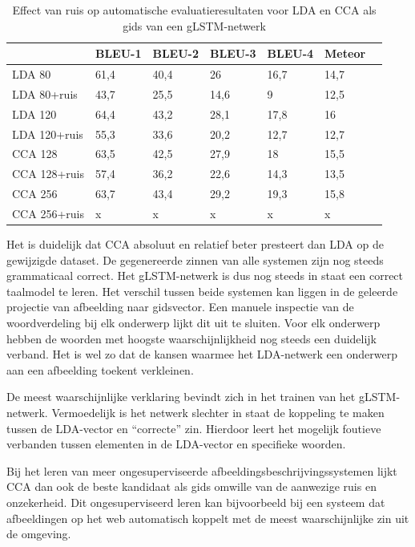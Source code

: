 \begin{table}
	\centering
	\begin{tabular}{lllllll}
		~                  & BLEU-1 & BLEU-2 & BLEU-3 & BLEU-4 & Meteor \\ \hline
		LDA 80        & 61,4   & 40,4 			& 26   & 16,7  & 14,7 \\
		LDA 80+ruis & 43,7  &25,5    &14,6   & 9   & 12,5 \\ \hline
		LDA 120   & 64,4   & 43,2   & 28,1   & 17,8 & 16 \\
		LDA 120+ruis   & 55,3   & 33,6   & 20,2   & 12,7 & 12,7 \\ \hline
		CCA 128   & 63,5   & 42,5   & 27,9   & 18 & 15,5 \\
		CCA 128+ruis   & 57,4   & 36,2   & 22,6   & 14,3 & 13,5 \\ \hline
		CCA 256   & 63,7   & 43,4   & 29,2   & 19,3 & 15,8 \\
		CCA 256+ruis   & x  & x   & x   & x & x \\ \hline			
	\end{tabular}
	\caption{Effect van ruis op automatische evaluatieresultaten voor LDA en CCA als gids van een gLSTM-netwerk}
	\label{table:ruis}
\end{table}

Het is duidelijk dat CCA absoluut en relatief beter presteert dan LDA op de gewijzigde dataset.
De gegenereerde zinnen van alle systemen zijn nog steeds grammaticaal correct.
Het gLSTM-netwerk is dus nog steeds in staat een correct taalmodel te leren.
Het verschil tussen beide systemen kan liggen in de geleerde projectie van afbeelding naar gidsvector.
Een manuele inspectie van de woordverdeling bij elk onderwerp lijkt dit uit te sluiten.
Voor elk onderwerp hebben de woorden met hoogste waarschijnlijkheid nog steeds een duidelijk verband.
Het is wel zo dat de kansen waarmee het LDA-netwerk een onderwerp aan een afbeelding toekent verkleinen.

De meest waarschijnlijke verklaring bevindt zich in het trainen van het gLSTM-netwerk.
Vermoedelijk is het netwerk slechter in staat de koppeling te maken tussen de LDA-vector en ``correcte'' zin. 
Hierdoor leert het mogelijk foutieve verbanden tussen elementen in de LDA-vector en specifieke woorden.
	
Bij het leren van meer ongesuperviseerde afbeeldingsbeschrijvingssystemen lijkt CCA dan ook de beste kandidaat als gids omwille van de aanwezige ruis en onzekerheid.
Dit ongesuperviseerd leren kan bijvoorbeeld bij een systeem dat afbeeldingen op het web automatisch koppelt met de meest waarschijnlijke zin uit de omgeving.

